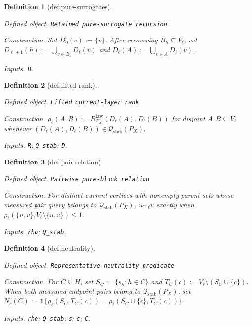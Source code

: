 \documentclass{article}
\newtheorem{definition}{Definition}
\begin{document}
\begin{definition}[def:pure-surrogates]\label{def:pure-surrogates}
\par\smallskip\noindent\emph{Defined object.} \texttt{Retained pure-\allowbreak{}surrogate recursion}
\par\smallskip\noindent\emph{Construction.} Set \(D_0(v):=\{v\}\). After recovering \(B_h\subseteq V_\ell\), set \(D_{\ell+1}(h):=\bigcup_{v\in B_h}D_\ell(v)\) and \(D_\ell(A):=\bigcup_{v\in A}D_\ell(v)\).
\par\smallskip\noindent\emph{Inputs.} \texttt{B}.
\end{definition}

\begin{definition}[def:lifted-rank]\label{def:lifted-rank}
\par\smallskip\noindent\emph{Defined object.} \texttt{Lifted current-\allowbreak{}layer rank}
\par\smallskip\noindent\emph{Construction.} \(\rho_\ell(A,B):=R^{\mathrm{law}}_{P_X}(D_\ell(A),D_\ell(B))\) for disjoint \(A,B\subseteq V_\ell\) whenever \((D_\ell(A),D_\ell(B))\in\mathcal Q_{\mathrm{stab}}(P_X)\).
\par\smallskip\noindent\emph{Inputs.} \texttt{R}; \texttt{Q\_\allowbreak{}stab}; \texttt{D}.
\end{definition}

\begin{definition}[def:pair-relation]\label{def:pair-relation}
\par\smallskip\noindent\emph{Defined object.} \texttt{Pairwise pure-\allowbreak{}block relation}
\par\smallskip\noindent\emph{Construction.} For distinct current vertices with nonempty parent sets whose measured pair query belongs to \(\mathcal Q_{\mathrm{stab}}(P_X)\), \(u\sim_\ell v\) exactly when \(\rho_\ell(\{u,v\},V_\ell\setminus\{u,v\})\le 1\).
\par\smallskip\noindent\emph{Inputs.} \texttt{rho}; \texttt{Q\_\allowbreak{}stab}.
\end{definition}

\begin{definition}[def:neutrality]\label{def:neutrality}
\par\smallskip\noindent\emph{Defined object.} \texttt{Representative-\allowbreak{}neutrality predicate}
\par\smallskip\noindent\emph{Construction.} For \(C\subseteq H\), set \(S_C:=\{s_h:h\in C\}\) and \(T_C(c):=V_\ell\setminus(S_C\cup\{c\})\). When both measured endpoint pairs belong to \(\mathcal Q_{\mathrm{stab}}(P_X)\), set \(N_c(C):=\mathbf 1\{\rho_\ell(S_C,T_C(c))=\rho_\ell(S_C\cup\{c\},T_C(c))\}\).
\par\smallskip\noindent\emph{Inputs.} \texttt{rho}; \texttt{Q\_\allowbreak{}stab}; \texttt{s}; \texttt{c}; \texttt{C}.
\end{definition}
\end{document}
